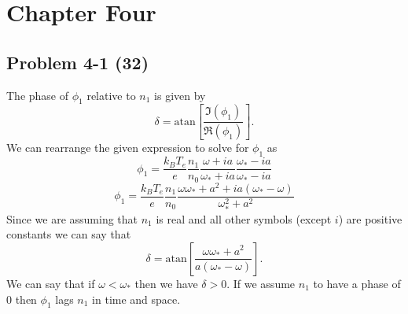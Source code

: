 \chapter*{Chapter Four}
\label{ch:Four}

\section*{Problem 4-1 (32)}
\label{sec:4-1}
The phase of \(\phi_1 \) relative to \(n_1\) is given by
\begin{equation*}
\delta = \text{atan}\left[\dfrac{\Im(\phi_1)}{\Re(\phi_1)} \right].
\end{equation*}
We can rearrange the given expression to solve for \(\phi_1 \) as
\begin{equation*}
	\phi_1 = \dfrac{k_BT_e}{e}\dfrac{n_1}{n_0}\dfrac{\omega + ia}{\omega_* + ia} \dfrac{\omega_* - ia}{\omega_*-ia}
\end{equation*}
\begin{equation*}
	\phi_1 = \dfrac{k_BT_e}{e}\dfrac{n_1}{n_0}\dfrac{\omega\omega_* + a^2 + ia(\omega_* - \omega)}{\omega_*^2 + a^2}
\end{equation*}
Since we are assuming that \(n_1\) is real and all other symbols (except \(i\)) are positive constants we can say that
\begin{equation*}
	\delta = \text{atan}\left[\dfrac{\omega\omega_* + a^2}{a(\omega_*-\omega)} \right].
\end{equation*}
We can say that if \(\omega < \omega_* \) then we have \(\delta > 0 \). If we assume \(n_1\) to have a phase of 0 then \(\phi_1\) lags \(n_1\) in time and space.


